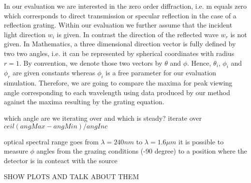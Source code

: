 In our evaluation we are interested in the zero order diffraction, i.e. m equals zero which corresponds to direct transmission or specular reflection in the case of a reflection grating. 
Within our evaluation we further assume that the incident light direction $w_i$ is given. In contrast the direction of the reflected wave $w_r$ is not given.
In Mathematics, a three dimensional direction vector is fully defined by two two angles, i.e. it can be represented by spherical coordinates with radius $r = 1$. By convention, we denote those two vectors by $\theta$ and $\phi$. Hence, $\theta_i$, $\phi_i$ and $\phi_r$ are given constants whereas $\phi_i$ is a free parameter for our evaluation simulation. Therefore, we are going to compare the maxima for peak viewing angle corresponding to each wavelength using data produced by our method against the maxima resulting by the grating equation.



which angle are we iterating over and which is steady?
iterate over $ceil(angMax - angMin) / angInc$

optical spectral range goes from $\lambda=240 nm$ to $\lambda=1.6 \mu m$
it is possible to measure $\phi$ angles from the grazing conditions (-90 degree) to a position where the detector is in conteact with the source


SHOW PLOTS AND TALK ABOUT THEM

